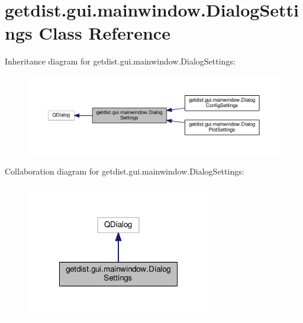 \hypertarget{classgetdist_1_1gui_1_1mainwindow_1_1DialogSettings}{}\section{getdist.\+gui.\+mainwindow.\+Dialog\+Settings Class Reference}
\label{classgetdist_1_1gui_1_1mainwindow_1_1DialogSettings}


Inheritance diagram for getdist.\+gui.\+mainwindow.\+Dialog\+Settings\+:
\nopagebreak
\begin{figure}[H]
\begin{center}
\leavevmode
\includegraphics[width=350pt]{classgetdist_1_1gui_1_1mainwindow_1_1DialogSettings__inherit__graph}
\end{center}
\end{figure}


Collaboration diagram for getdist.\+gui.\+mainwindow.\+Dialog\+Settings\+:
\nopagebreak
\begin{figure}[H]
\begin{center}
\leavevmode
\includegraphics[width=228pt]{classgetdist_1_1gui_1_1mainwindow_1_1DialogSettings__coll__graph}
\end{center}
\end{figure}
